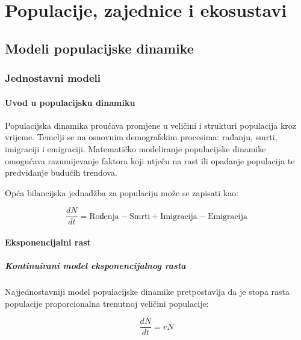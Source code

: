 \documentclass[11pt,oneside]{book}
\begin{document}
	\part{Populacije, zajednice i ekosustavi}
	
\chapter{Modeli populacijske dinamike}

\section{Jednostavni modeli}

\subsection{Uvod u populacijsku dinamiku}

Populacijska dinamika proučava promjene u veličini i strukturi populacija kroz vrijeme. Temelji se na osnovnim demografskim procesima: rađanju, smrti, imigraciji i emigraciji. Matematičko modeliranje populacijske dinamike omogućava razumijevanje faktora koji utječu na rast ili opadanje populacija te predviđanje budućih trendova.

Opća bilancijska jednadžba za populaciju može se zapisati kao:

\begin{equation}
	\frac{dN}{dt} = \text{Rođenja} - \text{Smrti} + \text{Imigracija} - \text{Emigracija}
\end{equation}

\subsection{Eksponencijalni rast}

\subsubsection{Kontinuirani model eksponencijalnog rasta}

Najjednostavniji model populacijske dinamike pretpostavlja da je stopa rasta populacije proporcionalna trenutnoj veličini populacije:

\begin{equation}
	\frac{dN}{dt} = rN
\end{equation}
\end{document}
